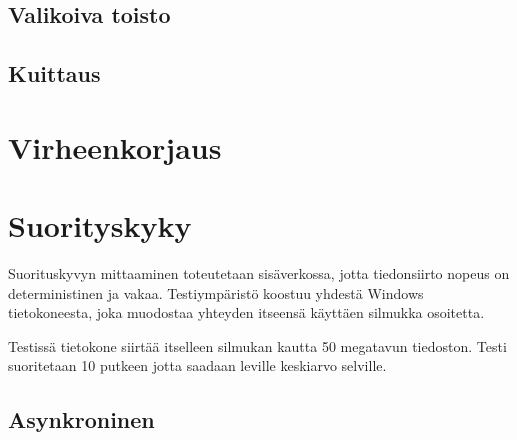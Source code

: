 \documentclass[a4paper,12pt]{article}
\begin{document}
        \subsection{Valikoiva toisto}\label{subsec:valikoiva_toisto}
        \blindtext
        \cite{greenwade93}


    \subsection{Kuittaus}\label{subsec:kuittaus}
    \blindtext


        \section{Virheenkorjaus}\label{sec:virheenkorjaus}
        \blindtext
        \cite{tietoliikenteenperusteet}



\section{Suorityskyky}
Suorituskyvyn mittaaminen toteutetaan sisäverkossa, jotta tiedonsiirto nopeus on deterministinen ja vakaa. 
Testiympäristö koostuu yhdestä Windows tietokoneesta, joka muodostaa yhteyden itseensä käyttäen silmukka osoitetta.\par
Testissä tietokone siirtää itselleen silmukan kautta 50 megatavun tiedoston. Testi suoritetaan 10 putkeen jotta saadaan leville keskiarvo selville.

\subsection{Asynkroninen }

    
    
\end{document}
